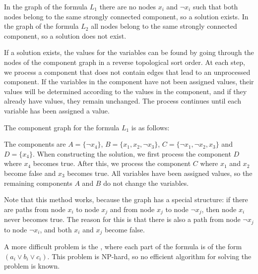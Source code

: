 In the graph of the formula $L_1$
there are no nodes $x_i$ and $\lnot x_i$
such that both nodes
belong to the same strongly connected component,
so a solution exists.
In the graph of the formula $L_2$
all nodes belong to the same strongly connected component,
so a solution does not exist.

If a solution exists, the values for the variables
can be found by going through the nodes of the
component graph in a reverse topological sort order.
At each step, we process a component
that does not contain edges that lead to an
unprocessed component.
If the variables in the component
have not been assigned values,
their values will be determined
according to the values in the component,
and if they already have values,
they remain unchanged.
The process continues until each variable
has been assigned a value.

The component graph for the formula $L_1$ is as follows:
\begin{center}
\end{center}

The components are
$A = \{\lnot x_4\}$,
$B = \{x_1, x_2, \lnot x_3\}$,
$C = \{\lnot x_1, \lnot x_2, x_3\}$ and
$D = \{x_4\}$.
When constructing the solution,
we first process the component $D$
where $x_4$ becomes true.
After this, we process the component $C$
where $x_1$ and $x_2$ become false
and $x_3$ becomes true.
All variables have been assigned values,
so the remaining components $A$ and $B$
do not change the variables.

Note that this method works, because the
graph has a special structure:
if there are paths from node $x_i$ to node $x_j$
and from node $x_j$ to node $\lnot x_j$,
then node $x_i$ never becomes true.
The reason for this is that there is also
a path from node $\lnot x_j$ to node $\lnot x_i$,
and both $x_i$ and $x_j$ become false.


A more difficult problem is the ,
where each part of the formula is of the form
$(a_i \lor b_i \lor c_i)$.
This problem is NP-hard, so no efficient algorithm
for solving the problem is known.

